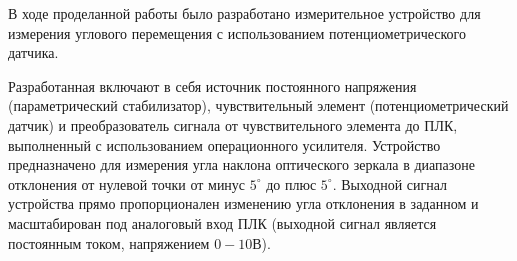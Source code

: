 В ходе проделанной работы было разработано измерительное устройство для измерения углового перемещения с использованием потенциометрического датчика.

Разработанная включают в себя источник постоянного напряжения (параметрический стабилизатор), чувствительный элемент (потенциометрический датчик) и преобразователь сигнала от чувствительного элемента до ПЛК, выполненный с использованием операционного усилителя.
Устройство предназначено для измерения угла наклона оптического зеркала в диапазоне отклонения от нулевой точки от минус $5^\circ $ до плюс $5^\circ$.
Выходной сигнал устройства прямо пропорционален изменению угла отклонения в заданном и масштабирован под аналоговый вход ПЛК (выходной сигнал является постоянным током, напряжением $0-10 \text{В}$).

